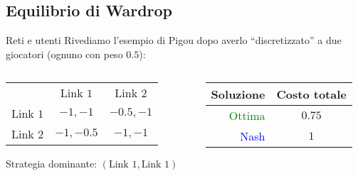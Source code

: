 \documentclass{beamer}
\theoremstyle{plain}
\theoremstyle{definition}
\theoremstyle{remark}
\newcommand{\pa}[1]{\left(#1\right)}
\begin{document}
\subsection{Equilibrio di Wardrop}

\begin{frame}{Reti e utenti}
  Rivediamo l'esempio di Pigou dopo averlo ``discretizzato'' a due
  giocatori (ognuno con peso $0.5$):
  \begin{center}
  \end{center}
  
  \begin{columns}
    \begin{column}{0.56\textwidth}
      \begin{tabular}{rcc}
        & Link $1$ & Link $2$ \\
        \cline{2-3}
        Link $1$ & \multicolumn{1}{|c|}{$-1,-1$} & \multicolumn{1}{|c|}{$-0.5,-1$}  \\
        \cline{2-3}
        Link $2$ & \multicolumn{1}{|c|}{$-1,-0.5$} & \multicolumn{1}{|c|}{$-1,-1$}  \\
        \cline{2-3}
      \end{tabular}
      \vspace{3px}

      Strategia dominante: $\pa{\text{Link }1, \text{Link }1}$
    \end{column}
    \begin{column}{0.44\textwidth}
      \begin{tabular}{r|c}
        Soluzione & Costo totale \\
        \hline
        \textcolor{green}{Ottima} & $0.75$ \\
        \textcolor{blue}{Nash} & $1$
      \end{tabular}
    \end{column}
  \end{columns}
\end{frame}
\end{document}
